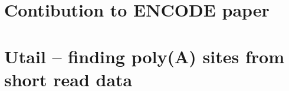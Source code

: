 \documentclass[]{ntnuthesis}
\begin{document}


%

%


\chapter{Contibution to ENCODE paper}



\appendix
\chapter{Utail -- finding poly(A) sites from short read data}


\printbibliography
\end{document}
